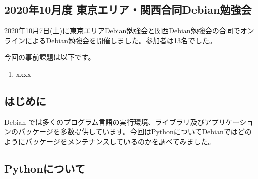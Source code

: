 \documentclass[mingoth,a4paper]{jsarticle}
\begin{document}

\subsection{2020年10月度 東京エリア・関西合同Debian勉強会}

2020年10月7日(土)に東京エリアDebian勉強会と関西Debian勉強会の合同でオンラインによるDebian勉強会を開催しました。参加者は13名でした。



今回の事前課題は以下です。

\begin{enumerate}
 \item xxxx
\end{enumerate}


\begin{multicols}{2}
{\small

}
\end{multicols}

%
%
%
%





\subsection{はじめに}

Debian では多くのプログラム言語の実行環境、ライブラリ及びアプリケーションのパッケージを多数提供しています。今回はPythonについてDebianではどのようにパッケージをメンテナンスしているのかを調べてみました。

\subsection{Pythonについて}
\end{document}
